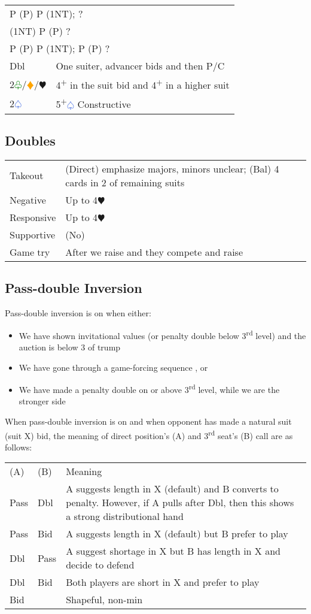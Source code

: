 \documentclass{article}
\renewcommand{\sp}{\textcolor{RoyalBlue}{$\varspade$}}
\newcommand{\he}{\textcolor{RubineRed}{$\varheart$}}
\newcommand{\di}{\textcolor{Orange}{$\vardiamond$}}
\newcommand{\cl}{\textcolor{Green}{$\varclub$}}
\newcommand{\nt}{\relsize{-1}NT\relsize{1}}
\newcommand{\up}{\textsuperscript{+}}
\begin{document}
\begin{tabular}{|l|p{6.5cm}}
	\multicolumn{2}{l}{P (P) P (1\nt{}); ?} \\
	\multicolumn{2}{l}{(1\nt{}) P (P) ?} \\
	\multicolumn{2}{l}{P (P) P (1\nt{}); P (P) ?} \\
    Dbl & One suiter, advancer bids and then P/C \\
    2\cl{}/\di{}/\he{} & 4\up{} in the suit bid and 4\up{} in a higher suit \\
    2\sp{} & 5\up\sp{} Constructive \\
\end{tabular}

\subsection{Doubles}

\begin{tabular}{|l|p{6.5cm}}
    Takeout & (Direct) emphasize majors, minors unclear; (Bal) 4 cards in 2 of remaining suits \\
    Negative & Up to 4\he{}\\
    Responsive & Up to 4\he{}\\
    Supportive & (No) \\
    Game try & After we raise and they compete and raise \\
\end{tabular}

\subsection{Pass-double Inversion}
Pass-double inversion is on when either:
\begin{itemize}
\itemsep0em
	\item We have shown invitational values (or penalty double below 3\textsuperscript{rd} level) and the auction is below 3 of trump
	\item We have gone through a game-forcing sequence , or
	\item We have made a penalty double on or above 3\textsuperscript{rd} level, while we are the stronger side
\end{itemize}
When pass-double inversion is on and when opponent has made a natural suit (suit X) bid, the meaning of direct position's (A) and 3\textsuperscript{rd} seat's (B) call are as follows: \\
\begin{tabular}{|l|l|p{6cm}}
	(A) & (B) & Meaning \\
	Pass & Dbl & A suggests length in X (default) and B converts to penalty. However, if A pulls after Dbl, then this shows a strong distributional hand \\
	Pass & Bid & A suggests length in X (default) but B prefer to play \\
	Dbl & Pass & A suggest shortage in X but B has length in X and decide to defend \\
	Dbl & Bid & Both players are short in X and prefer to play \\
	Bid & & Shapeful, non-min
\end{tabular}
\end{document}
